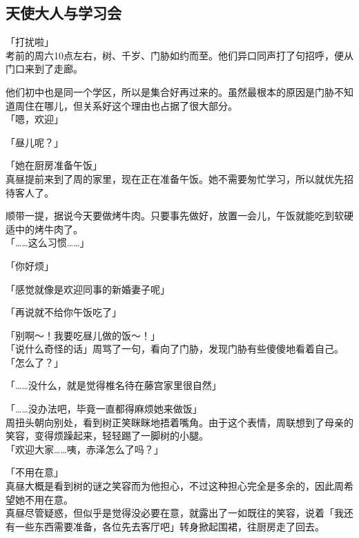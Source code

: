 \subsection{天使大人与学习会}

「打扰啦」\\

考前的周六10点左右，树、千岁、门胁如约而至。他们异口同声打了句招呼，便从门口来到了走廊。

他们初中也是同一个学区，所以是集合好再过来的。虽然最根本的原因是门胁不知道周住在哪儿，但关系好这个理由也占据了很大部分。\\

「嗯，欢迎」

「昼儿呢？」

「她在厨房准备午饭」\\

真昼提前来到了周的家里，现在正在准备午饭。她不需要匆忙学习，所以就优先招待客人了。

顺带一提，据说今天要做烤牛肉。只要事先做好，放置一会儿，午饭就能吃到软硬适中的烤牛肉了。\\

「……这么习惯……」

「你好烦」

「感觉就像是欢迎同事的新婚妻子呢」

「再说就不给你午饭吃了」

「别啊～！我要吃昼儿做的饭～！」\\

「说什么奇怪的话」周骂了一句，看向了门胁，发现门胁有些傻傻地看着自己。\\

「怎么了？」

「……没什么，就是觉得椎名待在藤宫家里很自然」

「……没办法吧，毕竟一直都得麻烦她来做饭」\\

周扭头朝向别处，看到树正笑眯眯地捂着嘴角。由于这个表情，周联想到了母亲的笑容，变得烦躁起来，轻轻踢了一脚树的小腿。\\

「欢迎大家……咦，赤泽怎么了吗？」

「不用在意」\\

真昼大概是看到树的谜之笑容而为他担心，不过这种担心完全是多余的，因此周希望她不用在意。\\

真昼尽管疑惑，但似乎是觉得没必要在意，就露出了一如既往的笑容，说着「我还有一些东西需要准备，各位先去客厅吧」转身掀起围裙，往厨房走了回去。


